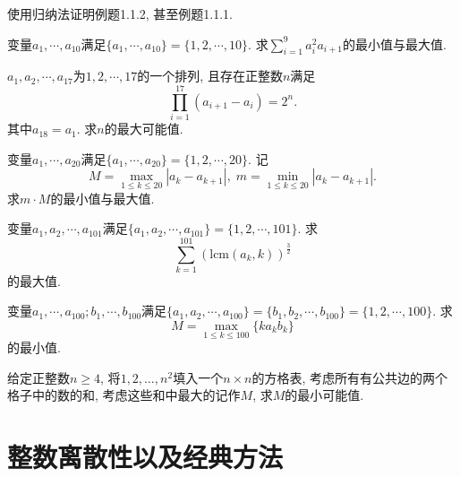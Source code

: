 \documentclass[lang=cn,12pt,thmcnt=section]{elegantbook}
\begin{document}
\exercisetitle

\begin{exercise}
使用归纳法证明例题1.1.2, 甚至例题1.1.1.
\end{exercise}

\begin{exercise}
变量$a_1,\cdots,a_{10}$满足$\{a_1,\cdots,a_{10}\}=\{1,2,\cdots,10\}$. 求$\sum_{i=1}^9 a_i^2 a_{i+1}$的最小值与最大值.
\end{exercise}

\begin{exercise}
$a_1,a_2,\cdots,a_{17}$为$1,2,\cdots,17$的一个排列, 且存在正整数$n$满足
\[\prod_{i=1}^{17}(a_{i+1}-a_i)=2^n.\]
其中$a_{18}=a_1$. 求$n$的最大可能值.
\end{exercise}

\begin{exercise}
变量$a_1,\cdots,a_{20}$满足$\{a_1,\cdots,a_{20}\}=\{1,2,\cdots,20\}$. 记
\[M=\max\limits_{1\le k\le 20}|a_k-a_{k+1}|,\;m=\min\limits_{1\le k\le 20}|a_k-a_{k+1}|.\]
求$m\cdot M$的最小值与最大值.
\end{exercise}

\begin{exercise}
变量$a_1,a_2,\cdots,a_{101}$满足$\{a_{1},a_{2},\cdots,a_{101}\}=\{1,2,\cdots,101\}$. 求
\[\sum_{k=1}^{101}(\mathrm{lcm}(a_{k},k))^{\frac{3}{2}}\]
的最大值.
\end{exercise}

\begin{exercise}
变量$a_1,\cdots,a_{100};b_1,\cdots,b_{100}$满足$\{a_1,a_2,\cdots,a_{100}\}=\{b_1,b_2,\cdots,b_{100}\}=\{1,2,\cdots,100\}$. 求
\[M=\max_{1\leq k\leq100}\{ka_{k}b_{k}\}\]
的最小值.
\end{exercise}

\begin{exercise}
给定正整数$n\ge 4$, 将$1,2,\dots{},n^2$填入一个$n\times n$的方格表, 考虑所有有公共边的两个格子中的数的和, 考虑这些和中最大的记作$M$, 求$M$的最小可能值.
\end{exercise}


\section{整数离散性以及经典方法}
\end{document}
